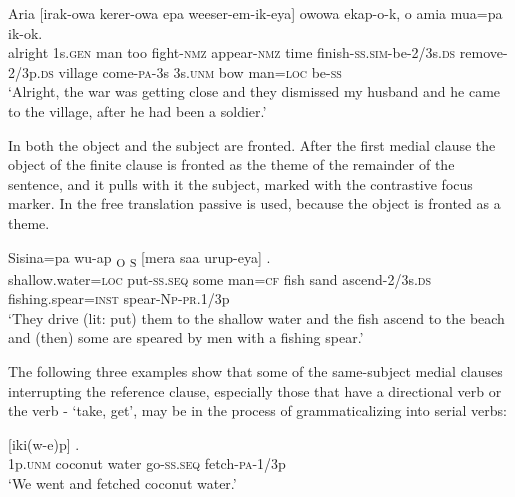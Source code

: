 \ea%
\label{ex:8:x1464}
\gll Aria       [irak-owa  kerer-owa  epa weeser-em-ik-eya]    owowa  ekap-o-k, o  amia  mua=pa  ik-ok.\\
alright  1s.\textsc{gen} man  too  fight-\textsc{nmz} appear-\textsc{nmz} time finish-\textsc{ss}.\textsc{sim}-be-2/3s.\textsc{ds} remove-2/3p.\textsc{ds} village come-\textsc{pa}-3s 3s.\textsc{unm} bow man=\textsc{loc} be-\textsc{ss}\\
\glt`Alright, the war was getting close and they dismissed my husband and he came to the village, after he had been a soldier.'
\z


In  both the object and the subject are fronted. After the first medial clause the object of the finite clause is fronted as the theme of the remainder of the sentence, and it pulls with it the subject, marked with the contrastive focus marker.  In the free translation passive is used, because the object is fronted as a theme.

\ea%
\label{ex:8:x1465}
\gll Sisina=pa  wu-ap  \textsubscript{O}  \textsubscript{S}  [mera  saa urup-eya]    . \\
shallow.water=\textsc{loc} put-\textsc{ss}.\textsc{seq} some man=\textsc{cf} fish sand ascend-2/3s.\textsc{ds} fishing.spear=\textsc{inst} spear-\textsc{Np}-\textsc{pr}.1/3p\\
\glt`They drive (lit: put) them to the shallow water and the fish ascend to the beach and (then) some are speared by men with a fishing spear.'
\z


The following three examples show that some of the same-subject medial clauses interrupting the reference clause, especially those that have a directional verb or the verb - `take, get', may be in the process of grammaticalizing into serial verbs: 

\ea%
\label{ex:8:x1466}
\gll {}    [iki(w-e)p]  . \\
1p.\textsc{unm} coconut  water  go-\textsc{ss}.\textsc{seq} fetch-\textsc{pa}-1/3p\\
\glt`We went and fetched coconut water.'
\z


